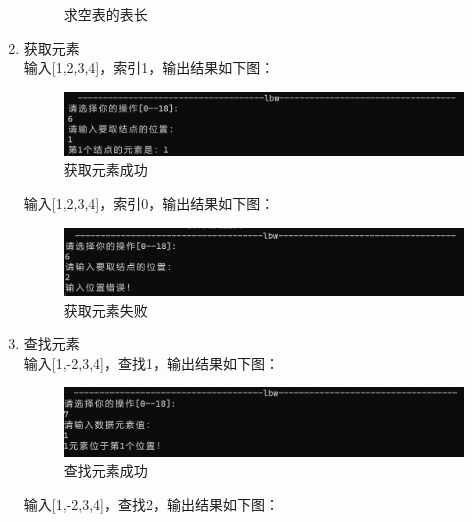 \documentclass[supercite]{Experimental_Report}
\theoremstyle{definition}
\begin{document}
\begin{enumerate}
\begin{figure}[htbp]
\begin{minipage}{0.7\linewidth}
		\end{minipage}
		\caption{求空表的表长}
		\label{fig1-17}
	\end{figure}
		\item 获取元素\\
		输入[1,2,3,4]，索引1，输出结果如下图：
		\begin{figure}[htbp]
			\centering
			\begin{minipage}{0.7\linewidth}
				\centering
				\includegraphics[width=0.9\linewidth]{images/取元素成功.png}
			\end{minipage}
			\caption{获取元素成功}
			\label{fig1-18}
		\end{figure}
			输入[1,2,3,4]，索引0，输出结果如下图：
	\begin{figure}[htbp]
		\centering
		\begin{minipage}{0.7\linewidth}
			\centering
			\includegraphics[width=0.9\linewidth]{images/取元素不合法.png}
		\end{minipage}
		\caption{获取元素失败}
		\label{fig1-18}
	\end{figure}

		\item 查找元素\\
		输入[1,-2,3,4]，查找1，输出结果如下图：
		\begin{figure}[htbp]
			\centering
			\begin{minipage}{0.7\linewidth}
				\centering
				\includegraphics[width=0.9\linewidth]{images/定位元素成功.png}
			\end{minipage}
			\caption{查找元素成功}
			\label{fig1-19}
		\end{figure}
		输入[1,-2,3,4]，查找2，输出结果如下图：
		

\end{enumerate}
\end{document}
